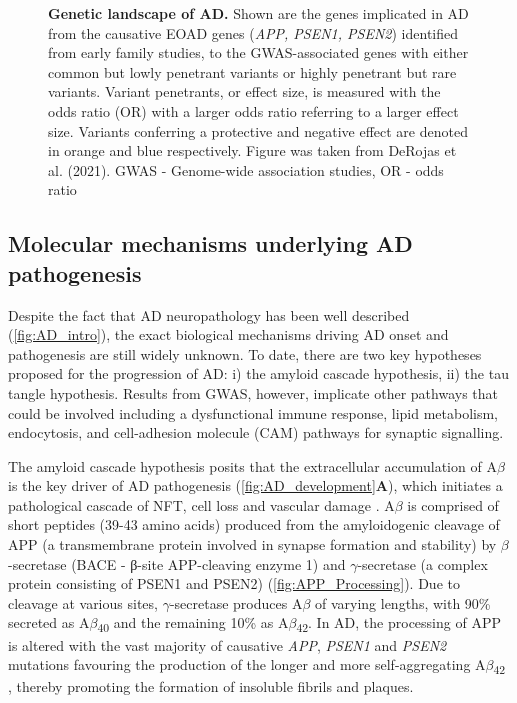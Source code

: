 \begin{landscape}
\begin{figure}[!htp]
		\caption[Genetic landscape of AD]%
		{\textbf{Genetic landscape of AD.} Shown are the genes implicated in AD from the causative EOAD genes (\textit{APP, PSEN1, PSEN2}) identified from early family studies, to the GWAS-associated genes with either common but lowly penetrant variants or highly penetrant but rare variants. Variant penetrants, or effect size, is measured with the odds ratio (OR) with a larger odds ratio referring to a larger effect size. Variants conferring a protective and negative effect are denoted in orange and blue respectively. Figure was taken from DeRojas et al. (2021)\cite{DeRojas2021}. GWAS - Genome-wide association studies, OR - odds ratio
		}
		\label{fig:AD_gwas}
	\end{figure}
\end{landscape}

\subsection{Molecular mechanisms underlying AD pathogenesis}
\label{aetiologyAD}
Despite the fact that AD neuropathology has been well described (\cref{fig:AD_intro}), the exact biological mechanisms driving AD onset and pathogenesis are still widely unknown. To date, there are two key hypotheses proposed for the progression of AD: i) the amyloid cascade hypothesis, ii) the tau tangle hypothesis. Results from GWAS, however, implicate other pathways that could be involved including a dysfunctional immune response, lipid metabolism, endocytosis, and cell-adhesion molecule (CAM) pathways for synaptic signalling.  

The amyloid cascade hypothesis posits that the extracellular accumulation of A$\beta$ is the key driver of AD pathogenesis (\cref{fig:AD_development}\textbf{A}), which initiates a pathological cascade of NFT, cell loss and vascular damage \cite{Hardy1992}. A$\beta$ is comprised of short peptides (39-43 amino acids) \cite{J1987} produced from the amyloidogenic cleavage of APP (a transmembrane protein involved in synapse formation and stability) by $\beta$-secretase (BACE - β-site APP-cleaving enzyme 1) and $\gamma$-secretase (a complex protein consisting of PSEN1 and PSEN2) (\cref{fig:APP_Processing}). Due to cleavage at various sites, $\gamma$-secretase produces A$\beta$ of varying lengths, with 90\% secreted as A$\beta$\textsubscript{40} and the remaining 10\% as A$\beta$\textsubscript{42}\cite{Asami-Odaka1995}. In AD, the processing of APP is altered with the vast majority of causative \textit{APP}, \textit{PSEN1} and \textit{PSEN2} mutations favouring the production of the longer and more self-aggregating A$\beta$\textsubscript{42} \cite{Li2019,D1996,JT1993}, thereby promoting the formation of insoluble fibrils and plaques\cite{JT1993}. 

